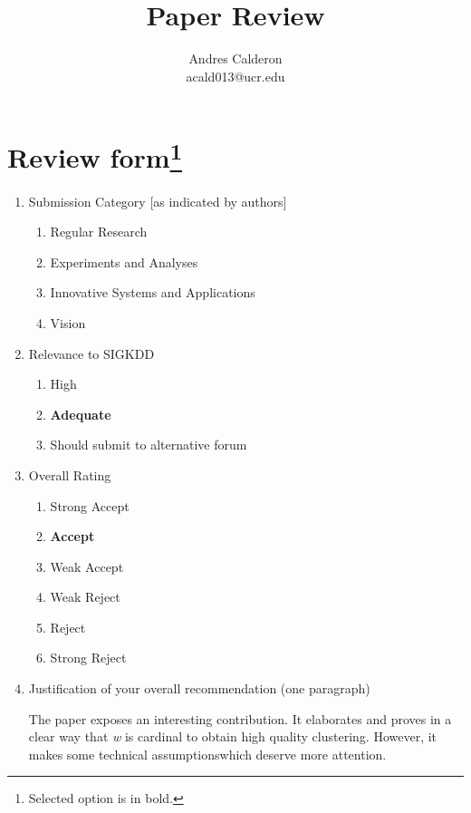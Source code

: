 \documentclass{article}
\title{Paper Review}
\author{Andres Calderon \\ acald013@ucr.edu}
\begin{document}
\maketitle

\section[Review form]{Review form\footnote{Selected option is in bold.}}
\begin{enumerate}
 \item Submission Category [as indicated by authors]
 \begin{enumerate}[I]
  \item Regular Research
  \item Experiments and Analyses
  \item Innovative Systems and Applications
  \item Vision
 \end{enumerate}
 
 \item Relevance to SIGKDD
 \begin{enumerate}[I]
  \item High
  \item \textbf{Adequate}
  \item Should submit to alternative forum
 \end{enumerate}

 \item Overall Rating
 \begin{enumerate}[I]
  \item Strong Accept
  \item \textbf{Accept}
  \item Weak Accept
  \item Weak Reject
  \item Reject
  \item Strong Reject
 \end{enumerate}
 
 \item Justification of your overall recommendation (one paragraph) \\ 
 \begin{framed}
 The paper exposes an interesting contribution.  It elaborates and proves in a clear way that \textit{w} is cardinal to obtain high quality clustering.  However, it makes some technical assumptions\footnotemark[2] which deserve more attention.
 \end{framed}
 

\end{enumerate}
\end{document}
